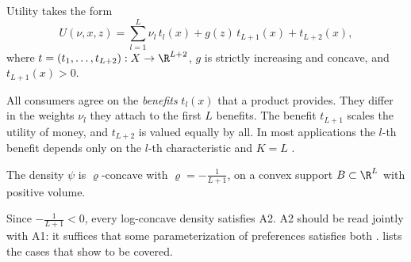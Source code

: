 \begin{assumption}\label{ass:04-cn-a1}
Utility takes the form
\begin{equation}\label{eq:04-cn-a1}
  U(\nu, x, z) = \sum_{l=1}^L \nu_l\,t_l(x) + g(z)\,t_{L+1}(x) + t_{L+2}(x),
\end{equation}
where $t = (t_1, \dots, t_{L+2}) : X \to \R^{L+2}$, $g$ is strictly increasing and concave, and $t_{L+1}(x) > 0$.
\end{assumption}

All consumers agree on the \emph{benefits} $t_l(x)$ that a product provides. They differ in the weights $\nu_l$
they attach to the first $L$ benefits. The benefit $t_{L+1}$ scales the utility of money, and $t_{L+2}$ is valued
equally by all. In most applications the $l$-th benefit depends only on the $l$-th characteristic and $K = L$
\citep[p.~5]{CaplinNalebuff1991}.

\begin{assumption}\label{ass:04-cn-a2}
The density $\psi$ is $\varrho$-concave with $\varrho = -\frac{1}{L+1}$, on a convex support $B \subset \R^L$ with positive
volume.
\end{assumption}

Since $-\frac{1}{L+1} < 0$, every log-concave density satisfies A2. A2 should be read jointly with A1: it suffices
that some parameterization of preferences satisfies both \citep[p.~6]{CaplinNalebuff1991}.
 lists the cases that \citet{CaplinNalebuff1991} show to be covered.

